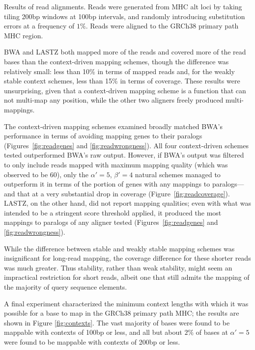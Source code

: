\begin{FPfigure}
{  }
  \caption[Results of read alignments]{Results of read alignments. Reads were generated from MHC alt loci by taking tiling 200bp windows at 100bp intervals, and randomly introducing substitution errors at a frequency of $1\%$. Reads were aligned to the GRCh38 primary path MHC region.}
  \label{fig:read}
\end{FPfigure}

BWA and LASTZ both mapped more of the reads and covered more of the read bases than the context-driven mapping schemes, though the difference was relatively small: less than 10\% in terms of mapped reads and, for the weakly stable context schemes, less than 15\% in terms of coverage. These results were unsurprising, given that a context-driven mapping scheme is a function that can not multi-map any position, while the other two aligners freely produced multi-mappings.

The context-driven mapping schemes examined broadly matched BWA's performance in terms of avoiding mapping genes to their paralogs (Figures~\ref{fig:readgenes} and \ref{fig:readwrongness}). All four context-driven schemes tested outperformed BWA's raw output. However, if BWA's output was filtered to only include reads mapped with maximum mapping quality (which was observed to be 60), only the $\alpha'=5$, $\beta'=4$ natural schemes managed to outperform it in terms of the portion of genes with any mappings to paralogs---and that at a very substantial drop in coverage (Figure~\ref{fig:readcoverage}). LASTZ, on the other hand, did not report mapping qualities; even with what was intended to be a stringent score threshold applied, it produced the most mappings to paralogs of any aligner tested (Figures~\ref{fig:readgenes} and \ref{fig:readwrongness}). 

While the difference between stable and weakly stable mapping schemes was insignificant for long-read mapping, the coverage difference for these shorter reads was much greater. Thus stability, rather than weak stability, might seem an impractical restriction for short reads, albeit one that still admits the mapping of the majority of query sequence elements.

A final experiment characterized the minimum context lengths with which it was possible for a base to map in the GRCh38 primary path MHC; the results are shown in Figure \ref{fig:contexts}. The vast majority of bases were found to be mappable with contexts of 100bp or less, and all but about $2\%$ of bases at $\alpha' = 5$ were found to be mappable with contexts of 200bp or less.


